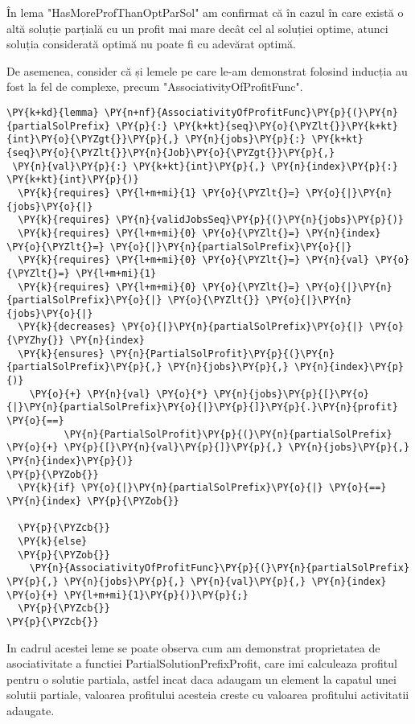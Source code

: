 În lema "HasMoreProfThanOptParSol" am confirmat că în cazul în care există o altă soluție parțială cu un profit mai mare decât cel al soluției optime, atunci soluția considerată optimă nu poate fi cu adevărat optimă.

De asemenea, consider că și lemele pe care le-am demonstrat folosind inducția au fost la fel de complexe, precum "AssociativityOfProfitFunc".

\begin{Verbatim}[commandchars=\\\{\},fontsize=\small]
\PY{k+kd}{lemma} \PY{n+nf}{AssociativityOfProfitFunc}\PY{p}{(}\PY{n}{partialSolPrefix} \PY{p}{:} \PY{k+kt}{seq}\PY{o}{\PYZlt{}}\PY{k+kt}{int}\PY{o}{\PYZgt{}}\PY{p}{,} \PY{n}{jobs}\PY{p}{:} \PY{k+kt}{seq}\PY{o}{\PYZlt{}}\PY{n}{Job}\PY{o}{\PYZgt{}}\PY{p}{,}
 \PY{n}{val}\PY{p}{:} \PY{k+kt}{int}\PY{p}{,} \PY{n}{index}\PY{p}{:} \PY{k+kt}{int}\PY{p}{)}
  \PY{k}{requires} \PY{l+m+mi}{1} \PY{o}{\PYZlt{}=} \PY{o}{|}\PY{n}{jobs}\PY{o}{|}
  \PY{k}{requires} \PY{n}{validJobsSeq}\PY{p}{(}\PY{n}{jobs}\PY{p}{)}
  \PY{k}{requires} \PY{l+m+mi}{0} \PY{o}{\PYZlt{}=} \PY{n}{index} \PY{o}{\PYZlt{}=} \PY{o}{|}\PY{n}{partialSolPrefix}\PY{o}{|}
  \PY{k}{requires} \PY{l+m+mi}{0} \PY{o}{\PYZlt{}=} \PY{n}{val} \PY{o}{\PYZlt{}=} \PY{l+m+mi}{1}
  \PY{k}{requires} \PY{l+m+mi}{0} \PY{o}{\PYZlt{}=} \PY{o}{|}\PY{n}{partialSolPrefix}\PY{o}{|} \PY{o}{\PYZlt{}} \PY{o}{|}\PY{n}{jobs}\PY{o}{|} 
  \PY{k}{decreases} \PY{o}{|}\PY{n}{partialSolPrefix}\PY{o}{|} \PY{o}{\PYZhy{}} \PY{n}{index}
  \PY{k}{ensures} \PY{n}{PartialSolProfit}\PY{p}{(}\PY{n}{partialSolPrefix}\PY{p}{,} \PY{n}{jobs}\PY{p}{,} \PY{n}{index}\PY{p}{)} 
    \PY{o}{+} \PY{n}{val} \PY{o}{*} \PY{n}{jobs}\PY{p}{[}\PY{o}{|}\PY{n}{partialSolPrefix}\PY{o}{|}\PY{p}{]}\PY{p}{.}\PY{n}{profit} \PY{o}{==}
          \PY{n}{PartialSolProfit}\PY{p}{(}\PY{n}{partialSolPrefix} \PY{o}{+} \PY{p}{[}\PY{n}{val}\PY{p}{]}\PY{p}{,} \PY{n}{jobs}\PY{p}{,} \PY{n}{index}\PY{p}{)}
\PY{p}{\PYZob{}}
  \PY{k}{if} \PY{o}{|}\PY{n}{partialSolPrefix}\PY{o}{|} \PY{o}{==} \PY{n}{index} \PY{p}{\PYZob{}}

  \PY{p}{\PYZcb{}}
  \PY{k}{else}
  \PY{p}{\PYZob{}}
    \PY{n}{AssociativityOfProfitFunc}\PY{p}{(}\PY{n}{partialSolPrefix} \PY{p}{,} \PY{n}{jobs}\PY{p}{,} \PY{n}{val}\PY{p}{,} \PY{n}{index} \PY{o}{+} \PY{l+m+mi}{1}\PY{p}{)}\PY{p}{;}
  \PY{p}{\PYZcb{}}
\PY{p}{\PYZcb{}}
\end{Verbatim}

In cadrul acestei leme se poate observa cum am demonstrat proprietatea de asociativitate a functiei  PartialSolutionPrefixProfit, care imi calculeaza profitul pentru o solutie partiala, astfel incat daca adaugam un element la capatul unei solutii partiale, valoarea profitului acesteia creste cu valoarea profitului activitatii adaugate. 

